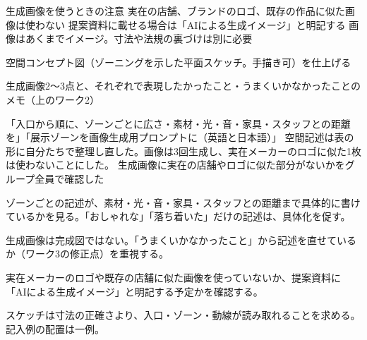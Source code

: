 \begin{caution}{生成画像を使うときの注意}
\achk 実在の店舗、ブランドのロゴ、既存の作品に似た画像は使わない
\achk 提案資料に載せる場合は「AIによる生成イメージ」と明記する
\achk 画像はあくまでイメージ。寸法や法規の裏づけは別に必要
\end{caution}

\begin{nexttime}
  \item 空間コンセプト図（ゾーニングを示した平面スケッチ。手描き可）を仕上げる
  \item 生成画像2〜3点と、それぞれで表現したかったこと・うまくいかなかったことのメモ（上のワーク2）
\end{nexttime}
{「入口から順に、ゾーンごとに広さ・素材・光・音・家具・スタッフとの距離を」「展示ゾーンを画像生成用プロンプトに（英語と日本語）」}
{空間記述は表の形に自分たちで整理し直した。画像は3回生成し、実在メーカーのロゴに似た1枚は使わないことにした。}
{生成画像に実在の店舗やロゴに似た部分がないかをグループ全員で確認した}

\begin{point}
  \item ゾーンごとの記述が、素材・光・音・家具・スタッフとの距離まで具体的に書けているかを見る。「おしゃれな」「落ち着いた」だけの記述は、具体化を促す。
  \item 生成画像は完成図ではない。「うまくいかなかったこと」から記述を直せているか（ワーク3の修正点）を重視する。
  \item 実在メーカーのロゴや既存の店舗に似た画像を使っていないか、提案資料に「AIによる生成イメージ」と明記する予定かを確認する。
  \item スケッチは寸法の正確さより、入口・ゾーン・動線が読み取れることを求める。記入例の配置は一例。
\end{point}

